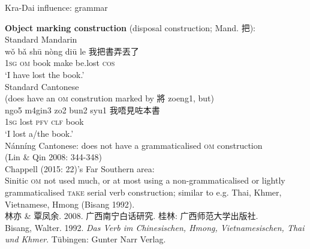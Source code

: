 \documentclass{beamer}
\begin{document}
\begin{frame}[fragile]{Kra-Dai influence: grammar}

{\footnotesize
\textbf{Object marking construction} {\scriptsize (disposal construction; Mand. 把)}:\\
\medskip
Standard Mandarin\\
wǒ bǎ shū nòng diū le 我把書弄丟了\\
\textsc{1sg} \textsc{om} book make be.lost \textsc{cos}\\
\enquote*{I have lost the book.}\\
\smallskip
Standard Cantonese\\
(does have an \textsc{om} constrution marked by 將 zoeng1, but)\\
ngo5 m4gin3 zo2 bun2 syu1 我唔見咗本書\\
\textsc{1sg} lost \textsc{pfv} \textsc{clf} book\\
\enquote*{I lost a/the book.}\\

\smallskip
Nánníng Cantonese: does not have a grammaticalised \textsc{om} construction\\ \quad (Lin \& Qin 2008: 344-348)\\
\medskip
Chappell (2015: 22)'s Far Southern area:\\
Sinitic \textsc{om} not used much, or at most using a non-grammaticalised or lightly grammaticalised \textsc{take} serial verb construction; similar to e.g. Thai, Khmer, Vietnamese, Hmong (Bisang 1992).\\

\vfill {} {\tiny 林亦 \& 覃凤余. 2008. 广西南宁白话研究. 桂林: 广西师范大学出版社.\\
Bisang, Walter. 1992. \textit{Das Verb im Chinesischen, Hmong, Vietnamesischen, Thai und Khmer}. Tübingen: Gunter Narr Verlag.} \par

}
\end{frame}
\end{document}
